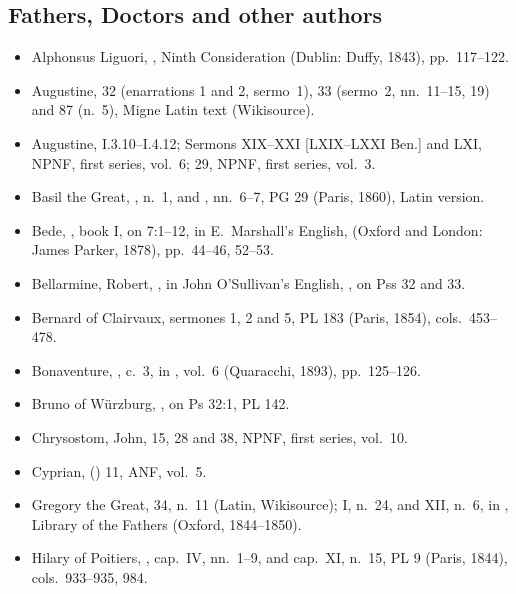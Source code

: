 {\subsection*{Fathers, Doctors and other authors}
\begin{itemize}[leftmargin=1.2em,itemsep=.25em]
\item Alphonsus Liguori, , Ninth Consideration
(Dublin: Duffy, 1843), pp.~117--122.
\item Augustine,  32 (enarrations 1 and 2,
sermo~1), 33 (sermo~2, nn.~11--15, 19) and 87 (n.~5), Migne Latin text
(Wikisource).
\item Augustine,  I.3.10--I.4.12; Sermons
XIX--XXI [LXIX--LXXI Ben.] and LXI, NPNF, first series, vol.~6;
 29, NPNF, first series, vol.~3.
\item Basil the Great, , n.~1, and
, nn.~6--7, PG 29 (Paris, 1860), Latin
version.
\item Bede, , book I, on 7:1--12, in E.~Marshall's
English,  (Oxford and London: James
Parker, 1878), pp.~44--46, 52--53.
\item Bellarmine, Robert, , in John O'Sullivan's
English, , on Pss 32 and 33.
\item Bernard of Clairvaux,  sermones 1, 2
and 5, PL 183 (Paris, 1854), cols.~453--478.
\item Bonaventure, , c.~3, in
, vol.~6 (Quaracchi, 1893), pp.~125--126.
\item Bruno of Würzburg, , on Ps 32:1, PL 142.
\item Chrysostom, John,  15, 28 and 38, NPNF, first
series, vol.~10.
\item Cyprian,  () 11,
ANF, vol.~5.
\item Gregory the Great,  34, n.~11 (Latin,
Wikisource);  I, n.~24, and XII, n.~6, in , Library of the Fathers (Oxford, 1844--1850).
\item Hilary of Poitiers, , cap.~IV,
nn.~1--9, and cap.~XI, n.~15, PL 9 (Paris, 1844), cols.~933--935, 984.

\end{itemize}}
